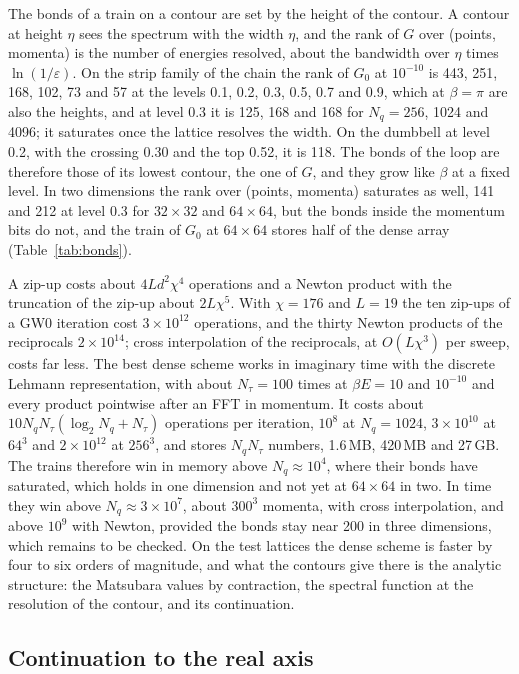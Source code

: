 \documentclass[aps,prb,reprint,a4paper]{revtex4-2}
\begin{document}
The bonds of a train on a contour are set by the height of the contour. A contour at height $\eta$ sees the spectrum with the width $\eta$, and the rank of $G$ over (points, momenta) is the number of energies resolved, about the bandwidth over $\eta$ times $\ln(1/\varepsilon)$. On the strip family of the chain the rank of $G_0$ at $10^{-10}$ is 443, 251, 168, 102, 73 and 57 at the levels 0.1, 0.2, 0.3, 0.5, 0.7 and 0.9, which at $\beta=\pi$ are also the heights, and at level 0.3 it is 125, 168 and 168 for $N_q=256$, 1024 and 4096; it saturates once the lattice resolves the width. On the dumbbell at level 0.2, with the crossing 0.30 and the top 0.52, it is 118. The bonds of the loop are therefore those of its lowest contour, the one of $G$, and they grow like $\beta$ at a fixed level. In two dimensions the rank over (points, momenta) saturates as well, 141 and 212 at level 0.3 for $32\times32$ and $64\times64$, but the bonds inside the momentum bits do not, and the train of $G_0$ at $64\times64$ stores half of the dense array (Table~\ref{tab:bonds}).

A zip-up costs about $4Ld^2\chi^4$ operations and a Newton product with the truncation of the zip-up about $2L\chi^5$. With $\chi=176$ and $L=19$ the ten zip-ups of a GW0 iteration cost $3\times10^{12}$ operations, and the thirty Newton products of the reciprocals $2\times10^{14}$; cross interpolation of the reciprocals, at $O(L\chi^3)$ per sweep, costs far less. The best dense scheme works in imaginary time with the discrete Lehmann representation, with about $N_\tau=100$ times at $\beta E=10$ and $10^{-10}$ and every product pointwise after an FFT in momentum. It costs about $10N_qN_\tau(\log_2N_q+N_\tau)$ operations per iteration, $10^8$ at $N_q=1024$, $3\times10^{10}$ at $64^3$ and $2\times10^{12}$ at $256^3$, and stores $N_qN_\tau$ numbers, 1.6\,MB, 420\,MB and 27\,GB. The trains therefore win in memory above $N_q\approx10^4$, where their bonds have saturated, which holds in one dimension and not yet at $64\times64$ in two. In time they win above $N_q\approx3\times10^7$, about $300^3$ momenta, with cross interpolation, and above $10^9$ with Newton, provided the bonds stay near 200 in three dimensions, which remains to be checked. On the test lattices the dense scheme is faster by four to six orders of magnitude, and what the contours give there is the analytic structure: the Matsubara values by contraction, the spectral function at the resolution of the contour, and its continuation.

\subsection{Continuation to the real axis}
\label{sec:gw_continuation}
\end{document}
